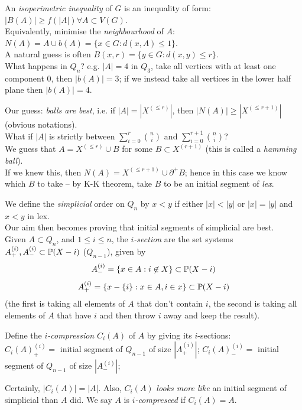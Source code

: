 \documentclass[a4paper]{article}
\begin{document}
An \emph{isoperimetric inequality} of $G$ is an inequality of form: $|B(A)| \geq f(|A|) \forall A \subset V(G)$.\\
Equivalently, minimise the \emph{neighbourhood} of $A$: $N(A) = A \cup b(A) = \{x \in G: d(x,A) \leq 1\}$.\\
A natural guess is often $B(x,r) = \{y \in G: d(x,y) \leq r\}$.\\
What happens in $Q_n$? e.g. $|A| = 4$ in $Q_3$, take all vertices with at least one component 0, then $|b(A)| = 3$; if we instead take all vertices in the lower half plane then $|b(A)| = 4$.

Our guess: \emph{balls are best}, i.e. if $|A| = |X^{(\leq r)}|$, then $|N(A)| \geq |X^{(\leq r+1)}|$ (obvious notations).\\
What if $|A|$ is strictly between $\sum_{i=0}^r {n \choose i}$ and $\sum_{i=0}^{r+1} {n \choose i}$?\\
We guess that $A=X^{(\leq r)} \cup B$ for some $B \subset X^{(r+1)}$ (this is called a \emph{hamming ball}).\\
If we knew this, then $N(A) = X^{(\leq r+1)} \cup \partial^+ B$; hence in this case we know which $B$ to take -- by K-K theorem, take $B$ to be an initial segment of \emph{lex}.

We define the \emph{simplicial} order on $Q_n$ by $x<y$ if either $|x| < |y|$ or $|x|=|y|$ and $x<y$ in lex.\\
Our aim then becomes proving that initial segments of simplicial are best.\\

Given $A \subset Q_n$, and $1 \leq i \leq n$, the \emph{$i$-section} are the set systems $A^{(i)}_+, A^{(i)}_- \subset \P(X-i)$ (\emph{$Q_{n-1}$}), given by
$$A^{(i)}_- = \{x \in A:i \not\in X \} \subset \P(X-i)$$
$$A^{(i)}_+ = \{x -\{i\}: x \in A, i \in x\} \subset \P(X-i)$$
(the first is taking all elements of $A$ that don't contain $i$, the second is taking all elements of $A$ that have $i$ and then throw $i$ away and keep the result).

Define the \emph{$i$-compression} $C_i(A)$ of $A$ by giving its $i$-sections:\\
$C_i(A)^{(i)}_+ =$ initial segment of $Q_{n-1}$ of size $|A^{(i)}_+|$;
$C_i(A)^{(i)}_- =$ initial segment of $Q_{n-1}$ of size $|A^{(i)}_-|$;

Certainly, $|C_i(A)| = |A|$. Also, $C_i(A)$ \emph{looks more like} an initial segment of simplicial than $A$ did. We say $A$ is \emph{$i$-compreseed} if $C_i(A) = A$.
\end{document}

